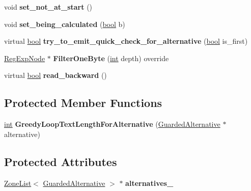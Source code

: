 \begin{DoxyCompactItemize}
void {\bfseries set\+\_\+not\+\_\+at\+\_\+start} ()
\item 
\mbox{\label{classv8_1_1internal_1_1ChoiceNode_a756fc92efb374945d6584a8f68ba9e1f}} 
void {\bfseries set\+\_\+being\+\_\+calculated} (\mbox{\hyperlink{classbool}{bool}} b)
\item 
\mbox{\label{classv8_1_1internal_1_1ChoiceNode_a92f25918d5b798881b60925507247cdf}} 
virtual \mbox{\hyperlink{classbool}{bool}} {\bfseries try\+\_\+to\+\_\+emit\+\_\+quick\+\_\+check\+\_\+for\+\_\+alternative} (\mbox{\hyperlink{classbool}{bool}} is\+\_\+first)
\item 
\mbox{\label{classv8_1_1internal_1_1ChoiceNode_ab00a04d448d8665a06af6f12a1d522ef}} 
\mbox{\hyperlink{classv8_1_1internal_1_1RegExpNode}{Reg\+Exp\+Node}} $\ast$ {\bfseries Filter\+One\+Byte} (\mbox{\hyperlink{classint}{int}} depth) override
\item 
\mbox{\label{classv8_1_1internal_1_1ChoiceNode_a807bb389712f32f0a2a356708b56d022}} 
virtual \mbox{\hyperlink{classbool}{bool}} {\bfseries read\+\_\+backward} ()
\end{DoxyCompactItemize}
\subsection*{Protected Member Functions}
\begin{DoxyCompactItemize}
\item 
\mbox{\label{classv8_1_1internal_1_1ChoiceNode_a4c728774f51d6874a8894a444486f10e}} 
\mbox{\hyperlink{classint}{int}} {\bfseries Greedy\+Loop\+Text\+Length\+For\+Alternative} (\mbox{\hyperlink{classv8_1_1internal_1_1GuardedAlternative}{Guarded\+Alternative}} $\ast$alternative)
\end{DoxyCompactItemize}
\subsection*{Protected Attributes}
\begin{DoxyCompactItemize}
\item 
\mbox{\label{classv8_1_1internal_1_1ChoiceNode_a3820e11ba725590ffc4e1d5d3a2b19ad}} 
\mbox{\hyperlink{classv8_1_1internal_1_1ZoneList}{Zone\+List}}$<$ \mbox{\hyperlink{classv8_1_1internal_1_1GuardedAlternative}{Guarded\+Alternative}} $>$ $\ast$ {\bfseries alternatives\+\_\+}
\end{DoxyCompactItemize}
